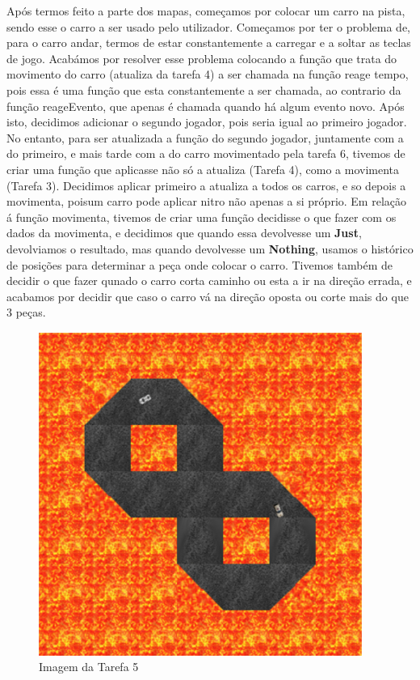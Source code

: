 \documentclass[a4paper]{report} %
\begin{document}
    Após termos feito a parte dos mapas, começamos por colocar um carro na pista, sendo esse o carro a ser usado pelo utilizador. Começamos por ter o problema de, para o carro andar, termos de estar constantemente a carregar e a soltar as teclas de jogo. Acabámos por resolver esse problema colocando a função que trata do movimento do carro (atualiza da tarefa 4) a ser chamada na função reage tempo, pois essa é uma função que esta constantemente a ser chamada, ao contrario da função reageEvento, que apenas é chamada quando há algum evento novo.
    Após isto, decidimos adicionar o segundo jogador, pois seria igual ao primeiro jogador.
    No entanto, para ser atualizada a função do segundo jogador, juntamente com  a do primeiro, e mais tarde com  a do carro movimentado pela tarefa 6, tivemos de criar uma função que aplicasse não só a atualiza (Tarefa 4), como a movimenta (Tarefa 3). Decidimos aplicar primeiro a atualiza a todos os carros, e so depois a movimenta, poisum carro pode aplicar nitro não apenas a si próprio. Em relação á função movimenta, tivemos de criar uma função decidisse o que fazer com os dados da movimenta, e decidimos que quando essa devolvesse um \textbf{Just}, devolviamos o resultado, mas quando devolvesse um \textbf{Nothing}, usamos o histórico de posições para determinar a peça onde colocar o carro.
    Tivemos também de decidir o que fazer qunado o carro corta caminho ou esta a ir na direção errada, e acabamos por decidir que caso o carro vá na direção oposta ou corte mais do que 3 peças. 
    
    \begin{figure}[H]
\includegraphics[properties]{imagemT5.png}    
\caption{Imagem da Tarefa 5 }
\end{figure}
\end{document}
